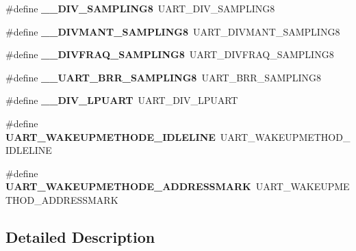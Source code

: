 \begin{DoxyCompactItemize}
\#define {\bfseries \+\_\+\+\_\+\+D\+I\+V\+\_\+\+S\+A\+M\+P\+L\+I\+N\+G8}~U\+A\+R\+T\+\_\+\+D\+I\+V\+\_\+\+S\+A\+M\+P\+L\+I\+N\+G8
\item 
\mbox{\label{group___h_a_l___u_a_r_t___aliased___defines_ga79e617709be4f56d9a327ca3a7dc316f}} 
\#define {\bfseries \+\_\+\+\_\+\+D\+I\+V\+M\+A\+N\+T\+\_\+\+S\+A\+M\+P\+L\+I\+N\+G8}~U\+A\+R\+T\+\_\+\+D\+I\+V\+M\+A\+N\+T\+\_\+\+S\+A\+M\+P\+L\+I\+N\+G8
\item 
\mbox{\label{group___h_a_l___u_a_r_t___aliased___defines_gac09eaea0db063364f5aac90f47791989}} 
\#define {\bfseries \+\_\+\+\_\+\+D\+I\+V\+F\+R\+A\+Q\+\_\+\+S\+A\+M\+P\+L\+I\+N\+G8}~U\+A\+R\+T\+\_\+\+D\+I\+V\+F\+R\+A\+Q\+\_\+\+S\+A\+M\+P\+L\+I\+N\+G8
\item 
\mbox{\label{group___h_a_l___u_a_r_t___aliased___defines_ga446f5df9b1c7c4f2bded186402dd4e62}} 
\#define {\bfseries \+\_\+\+\_\+\+U\+A\+R\+T\+\_\+\+B\+R\+R\+\_\+\+S\+A\+M\+P\+L\+I\+N\+G8}~U\+A\+R\+T\+\_\+\+B\+R\+R\+\_\+\+S\+A\+M\+P\+L\+I\+N\+G8
\item 
\mbox{\label{group___h_a_l___u_a_r_t___aliased___defines_gaa81cd3c42fac5a329fd499964658c20e}} 
\#define {\bfseries \+\_\+\+\_\+\+D\+I\+V\+\_\+\+L\+P\+U\+A\+RT}~U\+A\+R\+T\+\_\+\+D\+I\+V\+\_\+\+L\+P\+U\+A\+RT
\item 
\mbox{\label{group___h_a_l___u_a_r_t___aliased___defines_gab6e73a11dc29f715c2f3e48df9d9f30f}} 
\#define {\bfseries U\+A\+R\+T\+\_\+\+W\+A\+K\+E\+U\+P\+M\+E\+T\+H\+O\+D\+E\+\_\+\+I\+D\+L\+E\+L\+I\+NE}~U\+A\+R\+T\+\_\+\+W\+A\+K\+E\+U\+P\+M\+E\+T\+H\+O\+D\+\_\+\+I\+D\+L\+E\+L\+I\+NE
\item 
\mbox{\label{group___h_a_l___u_a_r_t___aliased___defines_ga0535d8a60a1563f7216a0f4b62a39c43}} 
\#define {\bfseries U\+A\+R\+T\+\_\+\+W\+A\+K\+E\+U\+P\+M\+E\+T\+H\+O\+D\+E\+\_\+\+A\+D\+D\+R\+E\+S\+S\+M\+A\+RK}~U\+A\+R\+T\+\_\+\+W\+A\+K\+E\+U\+P\+M\+E\+T\+H\+O\+D\+\_\+\+A\+D\+D\+R\+E\+S\+S\+M\+A\+RK
\end{DoxyCompactItemize}


\subsection{Detailed Description}
